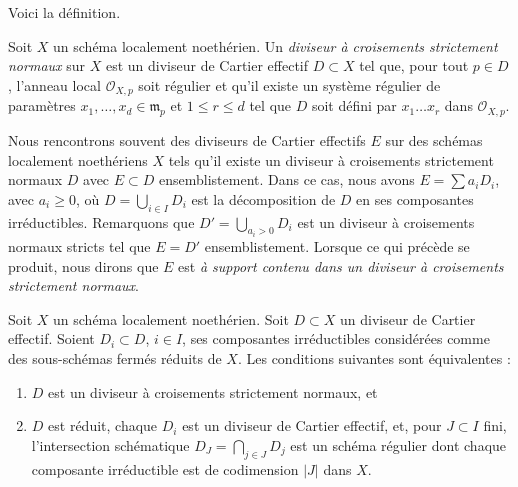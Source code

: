 \noindent
Voici la définition.

\begin{definition}
\label{definition-strict-normal-crossings}
Soit $X$ un schéma localement noethérien. Un
{\it diviseur à croisements strictement normaux}
sur $X$ est un diviseur de Cartier effectif $D \subset X$ tel que,
pour tout $p \in D$, l'anneau local $\mathcal{O}_{X, p}$ soit régulier
et qu'il existe un système régulier de paramètres
$x_1, \ldots, x_d \in \mathfrak m_p$ et $1 \leq r \leq d$
tel que $D$ soit défini par $x_1 \ldots x_r$ dans $\mathcal{O}_{X, p}$.
\end{definition}

\noindent
Nous rencontrons souvent des diviseurs de Cartier effectifs $E$ sur des schémas
localement noethériens $X$ tels qu'il existe un diviseur à croisements strictement normaux $D$
avec $E \subset D$ ensemblistement.
Dans ce cas, nous avons
$E = \sum a_i D_i$, avec $a_i \geq 0$, où $D = \bigcup_{i \in I} D_i$
est la décomposition de $D$ en ses composantes irréductibles.
Remarquons que $D' = \bigcup_{a_i > 0} D_i$ est un diviseur à croisements
normaux stricts tel que $E = D'$ ensemblistement.
Lorsque ce qui précède se produit, nous dirons que
$E$ est {\it à support contenu dans un diviseur à croisements strictement normaux}.

\begin{lemma}
\label{lemma-strict-normal-crossings}
Soit $X$ un schéma localement noethérien. Soit $D \subset X$ un
diviseur de Cartier effectif. Soient $D_i \subset D$, $i \in I$, ses
composantes irréductibles considérées comme des sous-schémas fermés réduits de $X$.
Les conditions suivantes sont équivalentes :
\begin{enumerate}
\item $D$ est un diviseur à croisements strictement normaux, et
\item $D$ est réduit, chaque $D_i$ est un diviseur de Cartier effectif, et,
pour $J \subset I$ fini, l'intersection schématique
$D_J = \bigcap_{j \in J} D_j$ est un schéma
régulier dont chaque composante irréductible est de
codimension $|J|$ dans $X$.
\end{enumerate}
\end{lemma}

